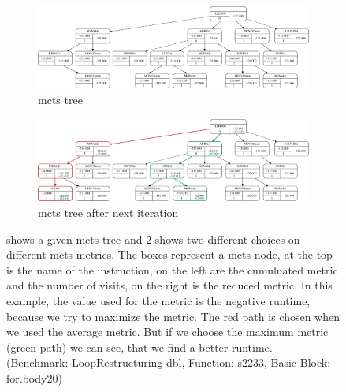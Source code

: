 \begin{figure}[p]
    \centering
    \begin{subfigure}[b]{0.3\textwidth}
        \centering
        \includegraphics[width=18cm,angle=90]{data/mcts-max-vs-avg/svg/selected/8752639012199.pdf}
        \caption{\ac{mcts} tree}
        \label{fig:approach:max-vs-avg:a}
    \end{subfigure}
    \hspace{0.2\textwidth}
    \begin{subfigure}[b]{0.3\textwidth}
        \centering
        \includegraphics[width=18cm,angle=90]{data/mcts-max-vs-avg/svg/selected/8752639012199-next.pdf}
        \caption{\ac{mcts} tree after next iteration}
        \label{fig:approach:max-vs-avg:b}
    \end{subfigure}
    \caption[\ac{mcts} tree with the consequences of maximum and average metric]{
         shows a given \ac{mcts} tree and \cref{fig:approach:max-vs-avg:b} shows two different choices on different \ac{mcts} metrics.
        The boxes represent a \ac{mcts} node, at the top is the name of the instruction, on the left are the cumuluated metric and the number of visits, on the right is the reduced metric.
        In this example, the value used for the metric is the negative runtime, because we try to maximize the metric.
        The red path is chosen when we used the average metric. But if we choose the maximum metric (green path) we can see, that we find a better runtime.\\
        (Benchmark: LoopRestructuring-dbl, Function: s2233, Basic Block: for.body20)
    }
    \label{fig:approach:max-vs-avg}
\end{figure}


